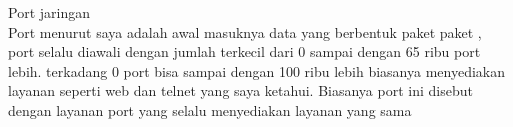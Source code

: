 \documentclass[12pt,times new roman,a4paper]{article}
\begin{document}
\noindent Port jaringan\\
\indent Port menurut saya adalah awal masuknya data yang berbentuk paket paket , port selalu diawali dengan jumlah terkecil dari 0 sampai dengan 65 ribu port lebih. terkadang 0 port bisa sampai dengan 100 ribu lebih biasanya menyediakan layanan seperti web dan telnet yang saya ketahui. Biasanya port ini disebut dengan layanan port yang selalu menyediakan layanan yang sama
\end{document}
